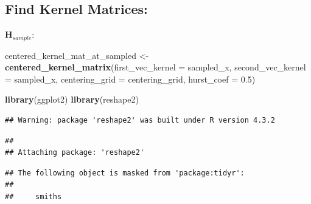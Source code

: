 \documentclass[
]{article}
\newenvironment{Shaded}{\begin{snugshade}}{\end{snugshade}}
\newcommand{\AttributeTok}[1]{\textcolor[rgb]{0.13,0.29,0.53}{#1}}
\newcommand{\FloatTok}[1]{\textcolor[rgb]{0.00,0.00,0.81}{#1}}
\newcommand{\FunctionTok}[1]{\textcolor[rgb]{0.13,0.29,0.53}{\textbf{#1}}}
\newcommand{\NormalTok}[1]{#1}
\newcommand{\OtherTok}[1]{\textcolor[rgb]{0.56,0.35,0.01}{#1}}
\begin{document}
\subsection{Find Kernel Matrices:}\label{find-kernel-matrices}

\(\mathbf{H}_{sample}\):

\begin{Shaded}
\begin{Highlighting}[]
\NormalTok{centered\_kernel\_mat\_at\_sampled }\OtherTok{\textless{}{-}} \FunctionTok{centered\_kernel\_matrix}\NormalTok{(}\AttributeTok{first\_vec\_kernel =}\NormalTok{ sampled\_x,}
                                                         \AttributeTok{second\_vec\_kernel =}\NormalTok{ sampled\_x,}
                                                         \AttributeTok{centering\_grid =}\NormalTok{ centering\_grid,}
                                                         \AttributeTok{hurst\_coef =} \FloatTok{0.5}\NormalTok{)}
\end{Highlighting}
\end{Shaded}

\begin{Shaded}
\begin{Highlighting}[]
\FunctionTok{library}\NormalTok{(ggplot2)}
\FunctionTok{library}\NormalTok{(reshape2)}
\end{Highlighting}
\end{Shaded}

\begin{verbatim}
## Warning: package 'reshape2' was built under R version 4.3.2
\end{verbatim}

\begin{verbatim}
## 
## Attaching package: 'reshape2'
\end{verbatim}

\begin{verbatim}
## The following object is masked from 'package:tidyr':
## 
##     smiths
\end{verbatim}
\end{document}
